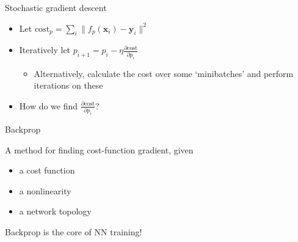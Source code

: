 \documentclass[presentation]{beamer}
\begin{document}
\begin{frame}[<+->][label={sec:orge6dcc42}]{Stochastic gradient descent}
\begin{itemize}
\item Let \(\mathrm{cost}_p = \sum_i \| f_p(\mathbf{x}_i) - \mathbf{y}_i\|^2\)
\item Iteratively let \(p_{i+1} = p_i - \eta \frac{\partial \mathrm{cost}}{\partial p_i}\)
\begin{itemize}
\item Alternatively, calculate the cost over some `minibatches' and perform iterations on these
\end{itemize}
\item How do we find \(\frac{\partial \mathrm{cost}}{\partial p_i}\)?
\end{itemize}
\end{frame}

\begin{frame}[label={sec:orgc8edd97}]{Backprop}
\begin{definition}[Backpropagation]
A method for finding cost-function gradient, given
\begin{itemize}
\item a cost function
\item a nonlinearity
\item a network topology
\end{itemize}
\end{definition}

\vfill
Backprop is the core of NN training!
\end{frame}
\end{document}
